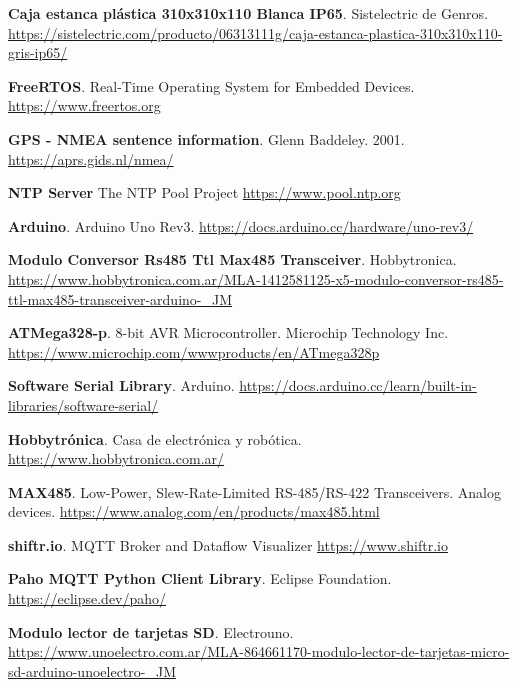 \begin{thebibliography}{30}
\textbf{Caja estanca plástica 310x310x110 Blanca IP65}. Sistelectric de Genros.
\href{https://sistelectric.com/producto/06313111g/caja-estanca-plastica-310x310x110-gris-ip65/}{https://sistelectric.com/producto/06313111g/caja-estanca-plastica-310x310x110-gris-ip65/}


\textbf{FreeRTOS}. Real-Time Operating System for Embedded Devices.
\href{https://www.freertos.org}{https://www.freertos.org}




\textbf{GPS - NMEA sentence information}. Glenn Baddeley. 2001.
\href{https://aprs.gids.nl/nmea/}{https://aprs.gids.nl/nmea/}

\textbf{NTP Server} The NTP Pool Project
\href{https://www.pool.ntp.org}{https://www.pool.ntp.org}



\textbf{Arduino}. Arduino Uno Rev3.
\href{https://docs.arduino.cc/hardware/uno-rev3/}{https://docs.arduino.cc/hardware/uno-rev3/}

\textbf{Modulo Conversor Rs485 Ttl Max485 Transceiver}. Hobbytronica. 
\href{https://www.hobbytronica.com.ar/MLA-1412581125-x5-modulo-conversor-rs485-ttl-max485-transceiver-arduino-_JM}{https://www.hobbytronica.com.ar/MLA-1412581125-x5-modulo-conversor-rs485-ttl-max485-transceiver-arduino-\_JM}

\textbf{ATMega328-p}. 8-bit AVR Microcontroller. Microchip Technology Inc. 
\href{https://www.microchip.com/wwwproducts/en/ATmega328p}{https://www.microchip.com/wwwproducts/en/ATmega328p}

\textbf{Software Serial Library}. Arduino. 
\href{https://docs.arduino.cc/learn/built-in-libraries/software-serial/}{https://docs.arduino.cc/learn/built-in-libraries/software-serial/}


\textbf{Hobbytrónica}. Casa de electrónica y robótica. 
\href{https://docs.arduino.cc/learn/built-in-libraries/software-serial/}{https://www.hobbytronica.com.ar/}

\textbf{MAX485}. Low-Power, Slew-Rate-Limited RS-485/RS-422 Transceivers. Analog devices.
\href{https://www.analog.com/en/products/max485.html}{https://www.analog.com/en/products/max485.html}


\textbf{shiftr.io}. MQTT Broker and Dataflow Visualizer
\href{https://www.shiftr.io}{https://www.shiftr.io}

\textbf{Paho MQTT Python Client Library}. Eclipse Foundation. 
\href{https://eclipse.dev/paho/}{https://eclipse.dev/paho/}


\textbf{Modulo lector de tarjetas SD}. Electrouno. 
\href{https://www.unoelectro.com.ar/MLA-864661170-modulo-lector-de-tarjetas-micro-sd-arduino-unoelectro-_JM}{https://www.unoelectro.com.ar/MLA-864661170-modulo-lector-de-tarjetas-micro-sd-arduino-unoelectro-\_JM}




 \end{thebibliography}